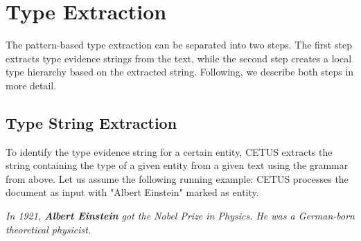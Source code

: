 

%
%
%
%

\section{Type Extraction}
\label{sec:docAnalysis}

The pattern-based type extraction can be separated into two steps.
The first step extracts type evidence strings from the text, while the second step creates a local type hierarchy based on the extracted string.
Following, we describe both steps in more detail.

\subsection{Type String Extraction}

To identify the type evidence string for a certain entity, CETUS extracts the string containing the type of a given entity from a given text using the grammar from above.
Let us assume the following running example: CETUS processes the document as input with "Albert Einstein" marked as entity.

\begin{center}
\emph{In 1921, \textbf{Albert Einstein} got the Nobel Prize in Physics. He was a German-born theoretical physicist.}
\end{center}

